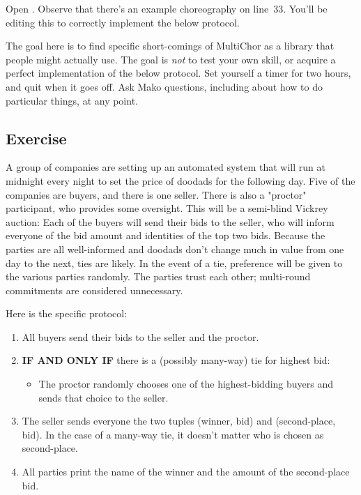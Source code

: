 Open .
Observe that there's an example choreography  on line~33.
You'll be editing this to correctly implement the below protocol.

The goal here is to find specific short-comings of MultiChor as a library that people might actually use.
The goal is \emph{not} to test your own skill, or acquire a perfect implementation of the below protocol.
Set yourself a timer for two hours, and quit when it goes off.
Ask Mako questions, including about how to do particular things, at any point.


\subsection{Exercise}

A group of companies are setting up an automated system
that will run at midnight every night to set the price of doodads for the following day.
Five of the companies are buyers, and there is one seller.
There is also a "proctor" participant, who provides some oversight.
This will be a semi-blind Vickrey auction:
Each of the buyers will send their bids to the seller,
who will inform everyone of the bid amount and identities of the top two bids.
Because the parties are all well-informed and doodads don't change much in value from one day to the next,
ties are likely.
In the event of a tie, preference will be given to the various parties randomly.
The parties trust each other; multi-round commitments are considered unnecessary.

Here is the specific protocol:
\begin{enumerate}
  \item All buyers send their bids to the seller and the proctor.
  \item \textbf{IF AND ONLY IF} there is a (possibly many-way) tie for highest bid:  
    \begin{itemize}
      \item The proctor randomly chooses one of the highest-bidding buyers and sends that choice to the seller.
    \end{itemize}
  \item The seller sends everyone the two tuples (winner, bid) and (second-place, bid).
   In the case of a many-way tie, it doesn't matter who is chosen as second-place.
 \item All parties print the name of the winner and the amount of the second-place bid.
\end{enumerate}

